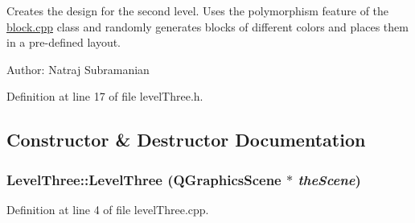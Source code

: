 Creates the design for the second level. Uses the polymorphism feature of the \hyperlink{block_8cpp}{block.cpp} class and randomly generates blocks of different colors and places them in a pre-\/defined layout.

Author: Natraj Subramanian 

Definition at line 17 of file levelThree.h.

\subsection{Constructor \& Destructor Documentation}
\hypertarget{class_level_three_a75bf86c7d294935953252f89586fb1d5}{
\subsubsection[{LevelThree}]{\setlength{\rightskip}{0pt plus 5cm}LevelThree::LevelThree (QGraphicsScene $\ast$ {\em theScene})}}
\label{class_level_three_a75bf86c7d294935953252f89586fb1d5}


Definition at line 4 of file levelThree.cpp.


